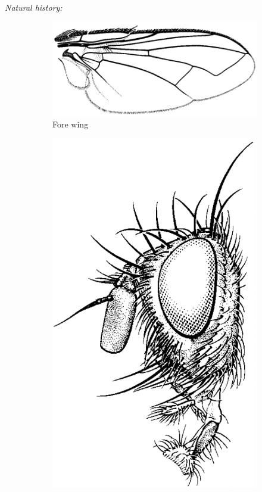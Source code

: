 \documentclass[letterpaper, 11pt]{article}
\begin{document}
\noindent{}\textit{Natural history:} \\

\begin{figure}[ht!]
    \centering
    \begin{subfigure}[ht!]{0.5\textwidth}
        \includegraphics[width=\textwidth]{TachinidWing}
        \caption{Fore wing \citep[][Fig. 110.201]{mcalpine1981manualv2}}
        \label{fig:tachinid1}
    \end{subfigure}
    \qquad
    \begin{subfigure}[ht!]{0.21\textwidth}
        \includegraphics[width=\textwidth]{TachinidHead}

\end{subfigure}
\end{figure}
\end{document}
